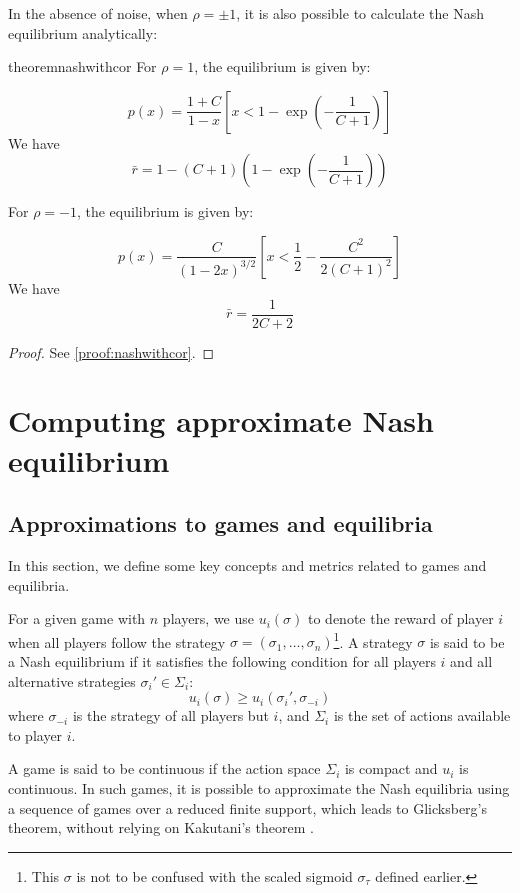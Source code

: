 \documentclass[preprint,12pt,authoryear]{elsarticle}
\theoremstyle{definition}
\begin{document}
In the absence of noise, when $\rho = \pm 1$, it is also possible to calculate the Nash equilibrium analytically:

\begin{restatable}{theorem}{nashwithcor}
\label{thm:nashwithcor}
        For $\rho = 1$, the equilibrium is given by:

    $$p(x) = \frac{1+C}{1-x} \left[x < 1 - \exp\left(-\frac{1}{C+1}\right)\right]$$ 
    We have $$\bar r = 1 - (C+1)\left(1-\exp\left(-\frac{1}{C+1}\right)\right)$$

    For $\rho = -1$, the equilibrium is given by:

    $$p(x) = \frac{C}{(1-2x)^{3/2}} \left[x < \frac{1}{2} - \frac{C^2}{2(C+1)^2}\right]$$
    We have  $$\bar r = \frac{1}{2C+2}$$

    
\end{restatable}
\begin{proof}
    See \ref{proof:nashwithcor}.    
\end{proof}
\section{Computing approximate Nash equilibrium}

\subsection{Approximations to games and equilibria}
\label{sec:approx}

In this section, we define some key concepts and metrics related to games and equilibria. 

For a given game with $n$ players, we use $u_i(\sigma)$ to denote the reward of player $i$ when all players follow the strategy $\sigma = (\sigma_1, \ldots, \sigma_n)$\footnote{This $\sigma$ is not to be confused with the scaled sigmoid $\sigma_\tau$ defined earlier.}. A strategy $\sigma$ is said to be a Nash equilibrium if it satisfies the following condition for all players $i$ and all alternative strategies $\sigma_i' \in \Sigma_i$: 
$$u_i(\sigma) \ge u_i(\sigma_i', \sigma_{-i})$$ 
where $\sigma_{-i}$ is the strategy of all players but $i$, and $\Sigma_i$ is the set of actions available to player $i$. 

A game is said to be continuous if the action space $\Sigma_i$ is compact and $u_i$ is continuous. In such games, it is possible to approximate the Nash equilibria using a sequence of games over a reduced finite support, which leads to Glicksberg’s theorem, without relying on Kakutani’s theorem \citep{myerson1997game}. 
\end{document}
